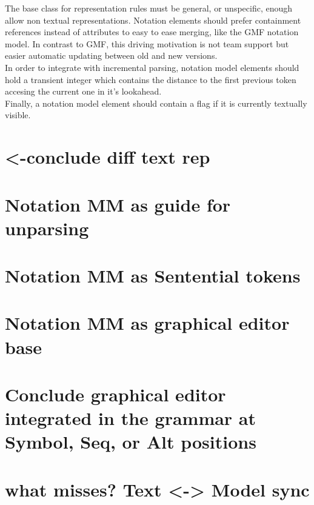 The base class for representation rules must be general, or unspecific, enough allow non textual representations. Notation elements should prefer containment references instead of attributes to easy to ease merging, like the GMF notation model. In contrast to GMF, this driving motivation is not team support but easier automatic updating between old and new versions.\\
In order to integrate with incremental parsing, notation model elements should hold a transient integer which contains the distance to the first previous token accesing the current one in it's lookahead. \\
Finally, a notation model element should contain a flag if it is currently textually visible.



\section{<-conclude diff text rep}
\section{Notation MM as guide for unparsing}
\section{Notation MM as Sentential tokens}
\section{Notation MM as graphical editor base}
\section{Conclude graphical editor integrated in the grammar at Symbol, Seq, or Alt positions}
\section{what misses? Text <-> Model sync}


